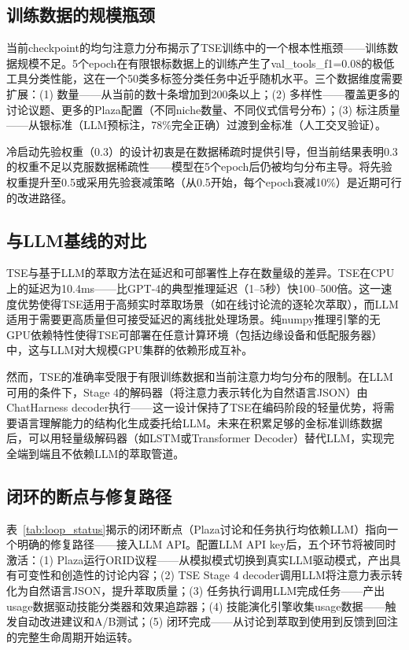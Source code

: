 \documentclass[conference]{IEEEtran}
\begin{document}
\subsection{训练数据的规模瓶颈}

当前checkpoint的均匀注意力分布揭示了TSE训练中的一个根本性瓶颈——训练数据规模不足。5个epoch在有限银标数据上的训练产生了val\_tools\_f1=0.08的极低工具分类性能，这在一个50类多标签分类任务中近乎随机水平。三个数据维度需要扩展：(1) 数量——从当前的数十条增加到200条以上；(2) 多样性——覆盖更多的讨论议题、更多的Plaza配置（不同niche数量、不同仪式信号分布）；(3) 标注质量——从银标准（LLM预标注，78\%完全正确）过渡到金标准（人工交叉验证）。

冷启动先验权重（0.3）的设计初衷是在数据稀疏时提供引导，但当前结果表明0.3的权重不足以克服数据稀疏性——模型在5个epoch后仍被均匀分布主导。将先验权重提升至0.5或采用先验衰减策略（从0.5开始，每个epoch衰减10\%）是近期可行的改进路径。

\subsection{与LLM基线的对比}

TSE与基于LLM的萃取方法在延迟和可部署性上存在数量级的差异。TSE在CPU上的延迟为10.4ms——比GPT-4的典型推理延迟（1--5秒）快100--500倍。这一速度优势使得TSE适用于高频实时萃取场景（如在线讨论流的逐轮次萃取），而LLM适用于需要更高质量但可接受延迟的离线批处理场景。纯numpy推理引擎的无GPU依赖特性使得TSE可部署在任意计算环境（包括边缘设备和低配服务器）中，这与LLM对大规模GPU集群的依赖形成互补。

然而，TSE的准确率受限于有限训练数据和当前注意力均匀分布的限制。在LLM可用的条件下，Stage 4的解码器（将注意力表示转化为自然语言JSON）由ChatHarness decoder执行——这一设计保持了TSE在编码阶段的轻量优势，将需要语言理解能力的结构化生成委托给LLM。未来在积累足够的金标准训练数据后，可以用轻量级解码器（如LSTM或Transformer Decoder）替代LLM，实现完全端到端且不依赖LLM的萃取管道。

\subsection{闭环的断点与修复路径}

表~\ref{tab:loop_status}揭示的闭环断点（Plaza讨论和任务执行均依赖LLM）指向一个明确的修复路径——接入LLM API。配置LLM API key后，五个环节将被同时激活：(1) Plaza运行ORID议程——从模拟模式切换到真实LLM驱动模式，产出具有可变性和创造性的讨论内容；(2) TSE Stage 4 decoder调用LLM将注意力表示转化为自然语言JSON，提升萃取质量；(3) 任务执行调用LLM完成任务——产出usage数据驱动技能分类器和效果追踪器；(4) 技能演化引擎收集usage数据——触发自动改进建议和A/B测试；(5) 闭环完成——从讨论到萃取到使用到反馈到回注的完整生命周期开始运转。
\end{document}
